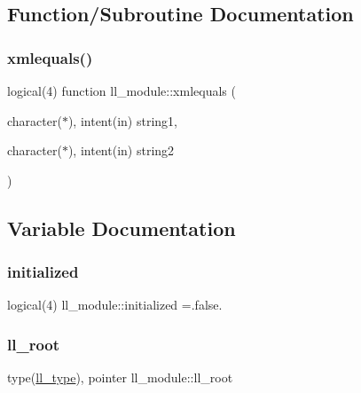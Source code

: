 \subsection{Function/\+Subroutine Documentation}
\mbox{\label{namespacell__module_a974bd171cab1f518654379cd52246d25}} 
\subsubsection{\texorpdfstring{xmlequals()}{xmlequals()}}
{\footnotesize\ttfamily logical(4) function ll\+\_\+module\+::xmlequals (\begin{DoxyParamCaption}\item[{character($\ast$), intent(in)}]{string1,  }\item[{character($\ast$), intent(in)}]{string2 }\end{DoxyParamCaption})}



\subsection{Variable Documentation}
\mbox{\label{namespacell__module_ae0a96b836378f392f389fe10174abc92}} 
\subsubsection{\texorpdfstring{initialized}{initialized}}
{\footnotesize\ttfamily logical(4) ll\+\_\+module\+::initialized =.false.}

\mbox{\label{namespacell__module_a5db1c240e6150f92ef1d67eaf85eef32}} 
\subsubsection{\texorpdfstring{ll\+\_\+root}{ll\_root}}
{\footnotesize\ttfamily type(\hyperlink{structll__module_1_1ll__type}{ll\+\_\+type}), pointer ll\+\_\+module\+::ll\+\_\+root}


